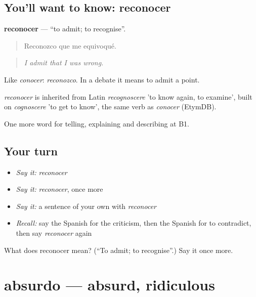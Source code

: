 \subsection*{You'll want to know: reconocer}
\textbf{reconocer} — \textquotedblleft{}to admit; to recognise\textquotedblright{}.

\begin{quote}
Reconozco que me equivoqué.
\end{quote}

\begin{quote}
\emph{I admit that I was wrong.}
\end{quote}

Like \emph{conocer}: \emph{reconozco}. In a debate it means to admit a point.

\begin{cousinweb}
\emph{reconocer} is inherited from Latin \emph{recognoscere} 'to know again, to examine', built on \emph{cognoscere} 'to get to know', the same verb as \emph{conocer} (EtymDB).
\end{cousinweb}

\begin{grammarlens}[title={What you've built}]
One more word for telling, explaining and describing at B1.
\end{grammarlens}

\subsection*{Your turn}
\begin{itemize}
\raggedright
  \item \emph{Say it:} \emph{reconocer}
  \item \emph{Say it:} \emph{reconocer}, once more
  \item \emph{Say it:} a sentence of your own with \emph{reconocer}
  \item \emph{Recall:} say the Spanish for the criticism, then the Spanish for to contradict, then say \emph{reconocer} again
\end{itemize}

\begin{tcolorbox}[breakable,colback=teal!4,colframe=teal!35!black,title={Before you move on}]
What does reconocer mean? (\textquotedblleft{}To admit; to recognise\textquotedblright{}.) Say it once more.
\end{tcolorbox}
\section[absurdo]{absurdo — absurd, ridiculous}

